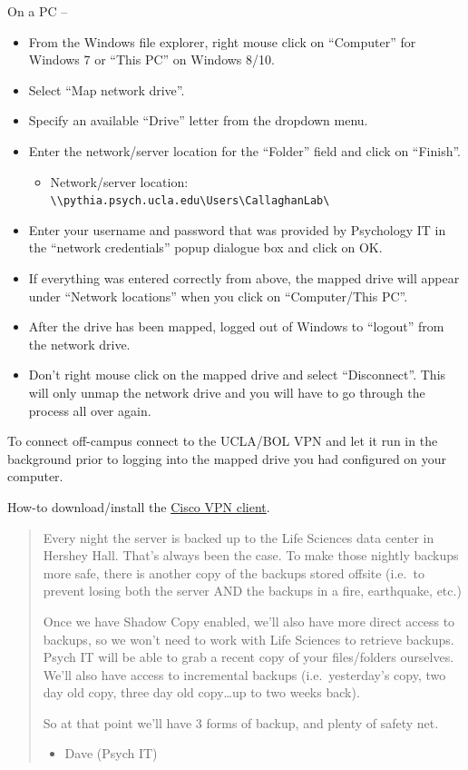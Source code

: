 \documentclass[]{book}
\providecommand{\tightlist}{%
  \setlength{\itemsep}{0pt}\setlength{\parskip}{0pt}}
\begin{document}
On a PC --

\begin{itemize}
\tightlist
\item
  From the Windows file explorer, right mouse click on ``Computer'' for Windows 7 or ``This PC'' on Windows 8/10.
\item
  Select ``Map network drive''.
\item
  Specify an available ``Drive'' letter from the dropdown menu.
\item
  Enter the network/server location for the ``Folder'' field and click on ``Finish''.

  \begin{itemize}
  \tightlist
  \item
    Network/server location: \texttt{\textbackslash{}\textbackslash{}pythia.psych.ucla.edu\textbackslash{}Users\textbackslash{}CallaghanLab\textbackslash{}}
  \end{itemize}
\item
  Enter your username and password that was provided by Psychology IT in the ``network credentials'' popup dialogue box and click on OK.
\item
  If everything was entered correctly from above, the mapped drive will appear under ``Network locations'' when you click on ``Computer/This PC''.
\item
  After the drive has been mapped, logged out of Windows to ``logout'' from the network drive.
\item
  Don't right mouse click on the mapped drive and select ``Disconnect''. This will only unmap the network drive and you will have to go through the process all over again.
\end{itemize}

To connect off-campus connect to the UCLA/BOL VPN and let it run in the background prior to logging into the mapped drive you had configured on your computer.

How-to download/install the \href{https://help.bol.ucla.edu/kb_view.do?sysparm_article=kb0010923}{Cisco VPN client}.

\begin{quote}
Every night the server is backed up to the Life Sciences data center in Hershey Hall. That's always been the case. To make those nightly backups more safe, there is another copy of the backups stored offsite (i.e.~to prevent losing both the server AND the backups in a fire, earthquake, etc.)

Once we have Shadow Copy enabled, we'll also have more direct access to backups, so we won't need to work with Life Sciences to retrieve backups. Psych IT will be able to grab a recent copy of your files/folders ourselves. We'll also have access to incremental backups (i.e.~yesterday's copy, two day old copy, three day old copy\ldots{}up to two weeks back).

So at that point we'll have 3 forms of backup, and plenty of safety net.

\begin{itemize}
\tightlist
\item
  Dave (Psych IT)
\end{itemize}
\end{quote}
\end{document}
